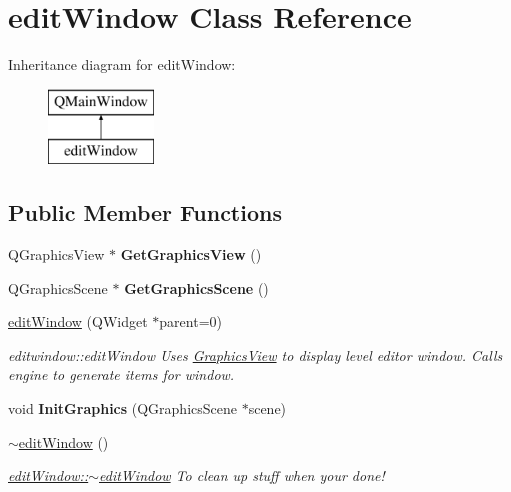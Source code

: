 \hypertarget{classedit_window}{\section{edit\-Window Class Reference}
\label{classedit_window}
}
Inheritance diagram for edit\-Window\-:\begin{figure}[H]
\begin{center}
\leavevmode
\includegraphics[height=2.000000cm]{classedit_window}
\end{center}
\end{figure}
\subsection*{Public Member Functions}
\begin{DoxyCompactItemize}
\item 
\hypertarget{classedit_window_a3584b9b685c463d050ce2925c13a44e7}{Q\-Graphics\-View $\ast$ {\bfseries Get\-Graphics\-View} ()}\label{classedit_window_a3584b9b685c463d050ce2925c13a44e7}

\item 
\hypertarget{classedit_window_aefaed4216416797acd5ade0da432f4dc}{Q\-Graphics\-Scene $\ast$ {\bfseries Get\-Graphics\-Scene} ()}\label{classedit_window_aefaed4216416797acd5ade0da432f4dc}

\item 
\hyperlink{classedit_window_a494969043b61ec9664804df9253cb8c9}{edit\-Window} (Q\-Widget $\ast$parent=0)
\begin{DoxyCompactList}\small\item\em editwindow\-::edit\-Window Uses \hyperlink{class_graphics_view}{Graphics\-View} to display level editor window. Calls engine to generate items for window. \end{DoxyCompactList}\item 
\hypertarget{classedit_window_a39528533eb2ffcc4a8442b3c02eb1ffd}{void {\bfseries Init\-Graphics} (Q\-Graphics\-Scene $\ast$scene)}\label{classedit_window_a39528533eb2ffcc4a8442b3c02eb1ffd}

\item 
\hypertarget{classedit_window_a0fc9d66a5d73435b5d1bf5626a8862c9}{\hyperlink{classedit_window_a0fc9d66a5d73435b5d1bf5626a8862c9}{$\sim$edit\-Window} ()}\label{classedit_window_a0fc9d66a5d73435b5d1bf5626a8862c9}

\begin{DoxyCompactList}\small\item\em \hyperlink{classedit_window_a0fc9d66a5d73435b5d1bf5626a8862c9}{edit\-Window\-::$\sim$edit\-Window} To clean up stuff when your done! \end{DoxyCompactList}\end{DoxyCompactItemize}


